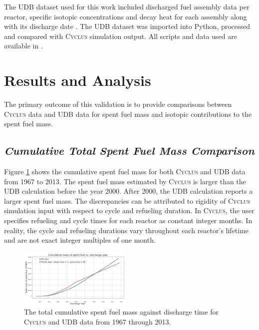 \documentclass{anstrans}
\newcommand{\Cyclus}{\textsc{Cyclus}\xspace}%
\begin{document}
The UDB dataset used for this work included discharged fuel assembly data per 
reactor, specific isotopic concentrations and decay heat for each assembly 
along with its discharge date \cite{peterson_unf-st&dards_2017}. The UDB 
dataset was imported into Python, processed and compared with \Cyclus 
simulation output. All scripts and data used are available in 
\cite{chee_arfc/transition-scenarios_2018}. 
\section{Results and Analysis}
The primary outcome of this validation is to provide comparisons between 
\Cyclus data and UDB data for spent fuel mass and isotopic contributions to the 
spent fuel mass. 

\subsection{\textit{Cumulative Total Spent Fuel Mass Comparison}}
Figure \ref{fig:total_original} shows the cumulative spent fuel mass for both 
\Cyclus and UDB data from 1967 to 2013. The spent fuel mass estimated by 
\Cyclus is larger than the UDB calculation before the year 2000. After 2000,
the UDB calculation reports a larger spent fuel mass. The discrepancies can be 
attributed to rigidity of \Cyclus simulation input with respect to cycle and 
refueling duration. In \Cyclus, the user specifies refueling and cycle times for each 
reactor as constant integer months.  In reality, the cycle and refueling durations 
vary throughout each reactor's lifetime and are not exact integer multiples of 
one month. 

\begin{figure}[t] %
	\centering
	\includegraphics[width=0.48\textwidth]{figures/total_cumulative_mass_spent_fuel_original}
	\caption{The total cumulative spent fuel mass against discharge time for \Cyclus and UDB data from 1967 through 2013.}
	\label{fig:total_original}
\end{figure}
\end{document}
